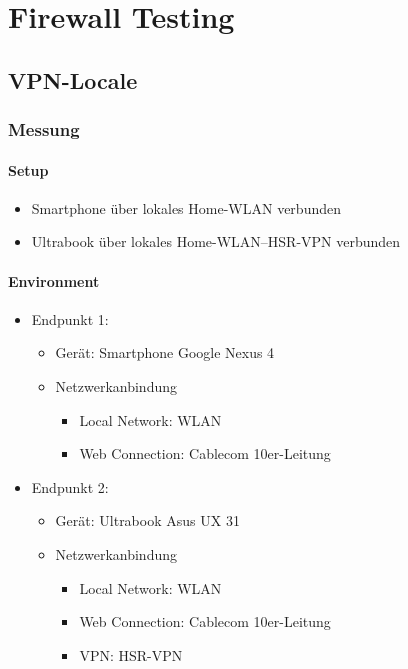 \chapter{Firewall Testing}
	\label{firewalltesting}
	
	
	\section{VPN-Locale}
	
		\subsection{Messung}
		
			\subsubsection{Setup}
				\begin{itemize}
					\item Smartphone über lokales Home-WLAN verbunden
					\item Ultrabook über lokales Home-WLAN–HSR-VPN verbunden
				\end{itemize}

			\subsubsection{Environment}
				\begin{itemize}
					\item Endpunkt 1:
						\begin{itemize}
						 	\item Gerät: Smartphone Google Nexus 4
						 	\item Netzwerkanbindung
						 		\begin{itemize}
						 			\item Local Network: WLAN
						 			\item Web Connection: Cablecom 10er-Leitung
						 		\end{itemize}
				 		\end{itemize}
					\item Endpunkt 2:
						\begin{itemize}
						 	\item Gerät: Ultrabook Asus UX 31
						 	\item Netzwerkanbindung
						 		\begin{itemize}
						 			\item Local Network: WLAN
						 			\item Web Connection: Cablecom 10er-Leitung
						 			\item VPN: HSR-VPN
						 		\end{itemize}
				 		\end{itemize}
				\end{itemize}
				
